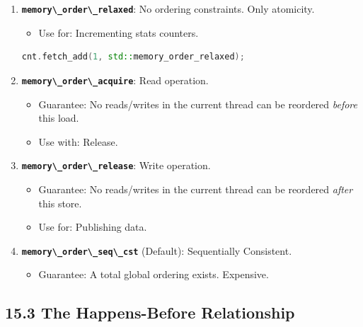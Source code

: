 \begin{enumerate}
\def\labelenumi{\arabic{enumi}.}
\tightlist
\item
  \textbf{\passthrough{\lstinline!memory\_order\_relaxed!}}: No ordering
  constraints. Only atomicity.

  \begin{itemize}
  \tightlist
  \item
    Use for: Incrementing stats counters.
  \end{itemize}

\begin{lstlisting}[language={C++}]
cnt.fetch_add(1, std::memory_order_relaxed);
\end{lstlisting}
\item
  \textbf{\passthrough{\lstinline!memory\_order\_acquire!}}: Read
  operation.

  \begin{itemize}
  \tightlist
  \item
    Guarantee: No reads/writes in the current thread can be reordered
    \emph{before} this load.
  \item
    Use with: Release.
  \end{itemize}
\item
  \textbf{\passthrough{\lstinline!memory\_order\_release!}}: Write
  operation.

  \begin{itemize}
  \tightlist
  \item
    Guarantee: No reads/writes in the current thread can be reordered
    \emph{after} this store.
  \item
    Use for: Publishing data.
  \end{itemize}
\item
  \textbf{\passthrough{\lstinline!memory\_order\_seq\_cst!}} (Default):
  Sequentially Consistent.

  \begin{itemize}
  \tightlist
  \item
    Guarantee: A total global ordering exists. Expensive.
  \end{itemize}
\end{enumerate}

\hypertarget{the-happens-before-relationship}{%
\subsection{15.3 The Happens-Before
Relationship}\label{the-happens-before-relationship}}

